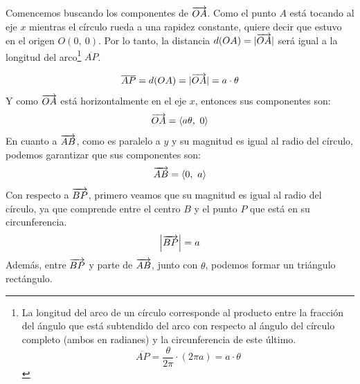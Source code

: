 \documentclass[12pt]{article}
\begin{document}
\begin{figure}[hbt!]
\centering


\end{figure}

Comencemos buscando los componentes de $\overrightarrow{OA}$. Como el punto $A$ está tocando al eje $x$ mientras el círculo rueda a una rapidez constante, quiere decir que estuvo en el origen $O(0, \ 0)$. Por lo tanto, la distancia $d(OA) = |\overrightarrow{OA}|$ será igual a la longitud del arco\footnote{La longitud del arco de un círculo corresponde al producto entre la fracción del ángulo que está subtendido del arco con respecto al ángulo del círculo completo (ambos en radianes) y la circunferencia de este último.\[\overline{AP} = \frac{\theta}{2 \pi} \cdot (2 \pi a) = a \cdot \theta\]} $\overline{AP}$.

\[
  \overline{AP} = d(OA) = |\overrightarrow{OA}| = a \cdot \theta
\]
Y como $\overrightarrow{OA}$ está horizontalmente en el eje $x$, entonces sus componentes son:
\[
  \overrightarrow{OA} = \langle a \theta, \ 0 \rangle
\]
En cuanto a $\overrightarrow{AB}$, como es paralelo a $y$ y su magnitud es igual al radio del círculo, podemos garantizar que sus componentes son:
\[
  \overrightarrow{AB} = \langle 0, \ a \rangle
\]
Con respecto a $\overrightarrow{BP}$, primero veamos que su magnitud es igual al radio del círculo, ya que comprende entre el centro $B$ y el punto $P$ que está en su circunferencia.
\[
  \left|\overrightarrow{BP}\right| = a
\]
Además, entre $\overrightarrow{BP}$ y parte de $\overrightarrow{AB}$, junto con $\theta$, podemos formar un triángulo rectángulo.
\end{document}
